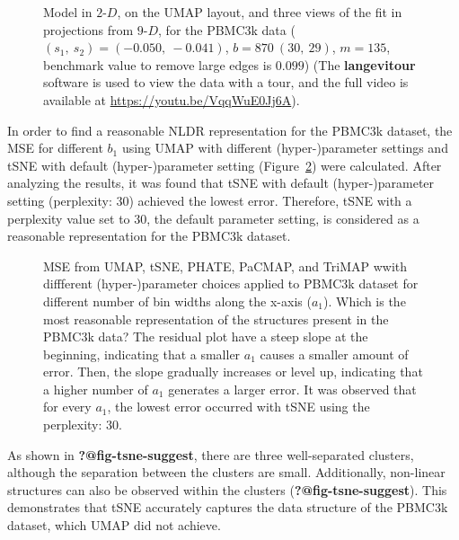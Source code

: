 \documentclass[
  12pt]{article}
\newcommand\gD{$2\text{-}D$}
\begin{document}
\begin{figure}[H]
\caption{\label{fig-pbmc1-sc}Model in \gD{}, on the UMAP layout, and
three views of the fit in projections from \(9\text{-}D\), for the
PBMC3k data (\((s_1, \ s_2) = (-0.050, \ -0.041)\),
\(b = 870 \  (30, \ 29)\), \(m = 135\), benchmark value to remove large
edges is \(0.099\)) (The \textbf{langevitour} software is used to view
the data with a tour, and the full video is available at
\url{https://youtu.be/VqqWuE0Jj6A}).}

\end{figure}%

In order to find a reasonable NLDR representation for the PBMC3k
dataset, the MSE for different \(b_1\) using UMAP with different
(hyper-)parameter settings and tSNE with default (hyper-)parameter
setting (Figure~\ref{fig-pbmc-mse}) were calculated. After analyzing the
results, it was found that tSNE with default (hyper-)parameter setting
(perplexity: \(30\)) achieved the lowest error. Therefore, tSNE with a
perplexity value set to \(30\), the default parameter setting, is
considered as a reasonable representation for the PBMC3k dataset.

\begin{figure}[H]


\caption{\label{fig-pbmc-mse}MSE from UMAP, tSNE, PHATE, PaCMAP, and
TriMAP wwith diffferent (hyper-)parameter choices applied to PBMC3k
dataset for different number of bin widths along the x-axis (\(a_1\)).
Which is the most reasonable representation of the structures present in
the PBMC3k data? The residual plot have a steep slope at the beginning,
indicating that a smaller \(a_1\) causes a smaller amount of error.
Then, the slope gradually increases or level up, indicating that a
higher number of \(a_1\) generates a larger error. It was observed that
for every \(a_1\), the lowest error occurred with tSNE using the
perplexity: \(30\).}

\end{figure}%

As shown in \textbf{?@fig-tsne-suggest}, there are three well-separated
clusters, although the separation between the clusters are small.
Additionally, non-linear structures can also be observed within the
clusters (\textbf{?@fig-tsne-suggest}). This demonstrates that tSNE
accurately captures the data structure of the PBMC3k dataset, which UMAP
did not achieve.
\end{document}
